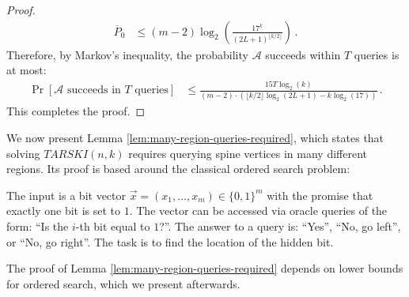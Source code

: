 \documentclass[11pt]{article}
\begin{document}
\begin{proof}
\begin{align}
    \overline{P}_0 &\leq (m-2) \log_2 \left(\frac{17^k}{(2L+1)^{\lfloor k/2 \rfloor}}\right) \,. 
\end{align}
Therefore, by Markov's inequality, the probability $\mathcal{A}$ succeeds within $T$ queries is at most:
\begin{align}
    \Pr [\text{$\mathcal{A}$ succeeds in $T$ queries}] &\leq \frac{15 T \log_2(k)}{(m-2) \cdot \left(\lfloor k/2 \rfloor \log_2(2L+1) - k \log_2 (17)\right)} \,. 
\end{align}
This completes the proof.
\end{proof}

We now present Lemma \ref{lem:many-region-queries-required}, which states that solving $TARSKI(n, k)$ requires querying spine vertices in many different regions. Its proof is based around the classical ordered search problem: 

\begin{definition} \label{def:ordered_search_problem}
		The  input is  a bit vector $\vec{x} = (x_1, \ldots, x_m) \in \{0,1\}^m$ with the promise that exactly one bit is set to $1$. The vector can be accessed  via oracle queries of the form: ``Is the $i$-th bit equal to $1$?''. The answer to a query is: ``Yes'', ``No, go left'', or ``No, go right''.
		The task is to find the location of the hidden bit. %
\end{definition}

\lemmamanyregionqueriesrequired* 

The proof of Lemma \ref{lem:many-region-queries-required} depends on lower bounds for ordered search, which we present afterwards.
\end{document}

